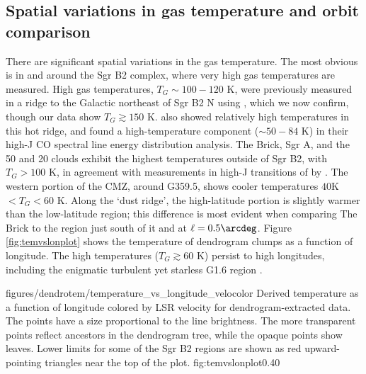 \subsection{Spatial variations in gas temperature and orbit comparison}
There are significant spatial variations in the gas temperature.  The most
obvious is in and around the Sgr B2 complex, where very high gas temperatures
are measured.  High gas temperatures, $T_G\sim100-120$ K, were previously
measured in a ridge to the Galactic northeast of Sgr B2 N using \methylcyanide
\citep[][Figure 4b]{de-Vicente1997a}, which we now confirm, though our data
show $T_G\gtrsim150$ K.  \citet{Ott2014a} also showed relatively high \ammonia
temperatures in this hot ridge, and \citet{Etxaluze2013a} found a
high-temperature component ($\sim50-84$ K) in their high-J CO spectral line
energy distribution analysis.
The Brick, Sgr A, and the 50 \kms and 20 \kms clouds exhibit the
highest temperatures outside of Sgr B2, with $T_G>100$ K, in agreement with measurements
in high-J transitions of \ammonia by \citet{Mills2013a}.  The western portion of the
CMZ, around G359.5, shows cooler temperatures $40 $K$ < T_G < 60$ K.  
Along the `dust ridge', the high-latitude portion is slightly warmer than the
low-latitude region; this difference is most evident when comparing The Brick
to the region just south of it and at $\ell=0.5\arcdeg$.
Figure \ref{fig:temvslonplot} shows the temperature of dendrogram clumps as a
function of longitude.  The high temperatures ($T_G\gtrsim60$ K) persist to high
longitudes, including the enigmatic turbulent yet starless G1.6 region
\citep{Menten2009a}.



\Figure
{figures/dendrotem/temperature_vs_longitude_velocolor}
{Derived temperature as a function of longitude colored by LSR velocity for
dendrogram-extracted data.  The points have a size proportional to the
\threeohthree line brightness.  The more transparent points reflect ancestors
in the dendrogram tree, while the opaque points show leaves.  Lower limits
for some of the Sgr B2 regions are shown as red upward-pointing triangles near
the top of the plot.}
{fig:temvslonplot}{0.4}{0}

